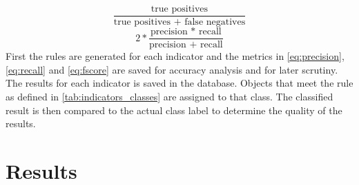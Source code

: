 \documentclass[authoryear,review,12pt,number]{elsarticle}
\begin{document}
\begin{equation}\label{eq:recall}
    \frac{\text{true positives}}{\text{true positives + false negatives}}
\end{equation}
\begin{equation}\label{eq:fscore}
    2 * \frac{\text{precision * recall}}{\text{precision + recall}}
\end{equation}
First the rules are generated for each indicator and the metrics in 
\ref{eq:precision}, \ref{eq:recall} and \ref{eq:fscore} are saved for accuracy 
analysis and for later scrutiny. The results for each indicator is saved in the 
database. Objects that meet the rule as defined in \ref{tab:indicators_classes} 
are assigned to that class. The classified result is then compared to the 
actual class label to determine the quality of the results.

\section{Results}
\end{document}

